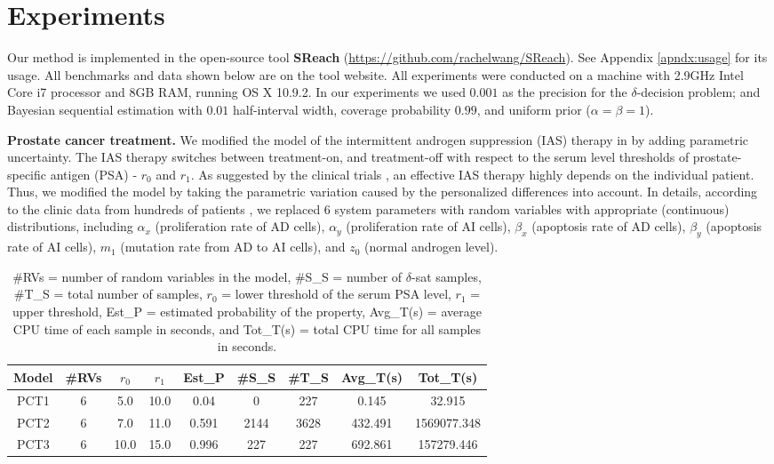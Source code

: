 \section{Experiments}
Our method is implemented in the open-source tool {\bf SReach} (\url{https://github.com/rachelwang/SReach}). See Appendix \ref{apndx:usage} for its usage. All benchmarks and data shown below are on the tool website. All experiments were conducted on a machine with 2.9GHz Intel Core i7 processor and 8GB RAM, running OS X 10.9.2. 
In our experiments we used $0.001$ as the precision for the $\delta$-decision problem; and Bayesian sequential estimation
with $0.01$ half-interval width, coverage probability $0.99$, and uniform prior ($\alpha = \beta = 1$). 

{\bf\noindent Prostate cancer treatment.}
We modified the model of the intermittent androgen suppression (IAS) therapy in \cite{tanaka2010mathematical} by adding parametric uncertainty. The IAS therapy switches between  treatment-on, and treatment-off with respect to the serum level thresholds of prostate-specific antigen (PSA) - $r_0$ and $r_1$. As suggested by the clinical trials \cite{bruchovsky2006final}, an effective IAS therapy highly depends on the individual patient. Thus, we modified the model by taking the parametric variation caused by the personalized differences into account. In details, according to the clinic data from hundreds of patients \cite{bruchovsky2007locally}, we replaced 6 system 
parameters with random variables with appropriate (continuous) distributions, including $\alpha_x$ (proliferation rate of AD cells), $\alpha_y$ (proliferation rate of AI cells), $\beta_x$ (apoptosis rate of AD cells), $\beta_y$ (apoptosis rate of AI cells), $m_1$ (mutation rate from AD to AI cells), and $z_0$ (normal androgen level).
\vspace{-.5cm}
\begin{table}[th!]
\captionsetup{font=scriptsize}
\centering
    \begin{tabular}{c|c|c|c|c|c|c|c|c}
    \hline
    Model & \#RVs & $r_0$ & $r_1$ & Est\_P & \#S\_S & \#T\_S & Avg\_T(s) & Tot\_T(s) \\ \hline
    PCT1  & 6     & 5.0  & 10.0 & 0.04   & 0      & 227    & 0.145   & 32.915     \\ \hline
    PCT2  & 6     & 7.0  & 11.0 & 0.591  & 2144   & 3628   & 432.491 & 1569077.348     \\ \hline
    PCT3  & 6     & 10.0 & 15.0 & 0.996  & 227    & 227    & 692.861   & 157279.446   \\ \hline
    \end{tabular}
    \caption{\#RVs = number of random variables in the model, \#S\_S = number of $\delta$-sat samples, 
\#T\_S = total number of samples, $r_0$ = lower threshold of the serum PSA level, $r_1$ = upper threshold, 
Est\_P = estimated probability of the property,  Avg\_T(s) = average CPU time of each sample in seconds, and Tot\_T(s) = total CPU time for all samples in seconds.}
    \label{table:prostate}
\end{table}
